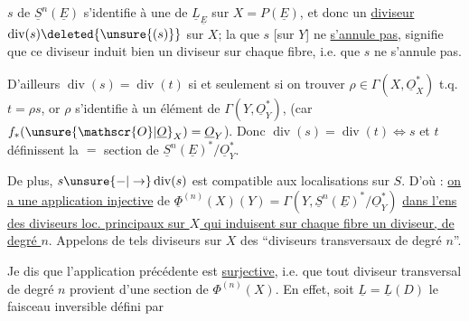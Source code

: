  $s$ de $\underline{S}^{n}(\underline{E})$ s'identifie à une  de $\underline{L}_{\underline{E}}$ sur $X=P(\underline{E})$, et   donc un \uline{diviseur} $\operatorname{div}(s)\deleted{\unsure{(s)}}$ sur $X$; la  que $s$ [sur $Y$] ne \uline{s'annule pas}, signifie que ce diviseur induit bien un diviseur sur chaque fibre,  i.e. que $s$ ne s'annule pas.

D'ailleurs  $\operatorname{div}(s)=\operatorname{div}(t)$  si et seulement si on  trouver $\rho\in\Gamma(X,\underline{O}_X^*)$ t.q. $t=\rho s$, or $\rho$ s'identifie à un élément de $\Gamma(Y,\underline{O}_Y^*)$, (car $f_*(\unsure{\mathscr{O}|\underline{O}}_X)=\underline{O}_Y$). Donc $\operatorname{div}(s)=\operatorname{div}(t)\Leftrightarrow s$ et $t$ définissent la $=$ section de $\underline{S}^{n}(\underline{E})^*/\underline{O}_Y^*$.

De plus, $s\unsure{-|\to}\operatorname{div}(s)$ est compatible aux localisations sur $S$. D'où : \uline{on a une application injective} de \deleted{$\unsure{\Phi|\varphi}$} $\underline{\Phi}^{(n)}(X)(Y)=\Gamma(Y,\underline{S}^{n}(\underline{E})^*/\underline{O}_Y^*)$ \uline{dans l'ens des diviseurs loc. principaux  sur $X$ qui induisent  sur chaque fibre un diviseur,  de degré $n$}. Appelons de tels diviseurs sur $X$ des ``diviseurs transversaux de degré $n$''.

Je dis que l'application précédente est \uline{surjective}, i.e. que tout diviseur transversal  de degré $n$ provient d'une section de $\Phi^{(n)}(X)$. En effet, soit $\underline{L}=\underline{L}(D)$ le faisceau inversible défini par

